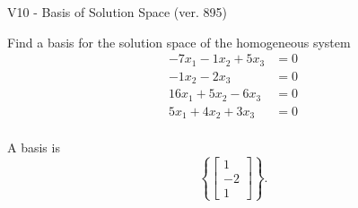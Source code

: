 \begin{exercise}
  \begin{exerciseTitle}V10 - Basis of Solution Space (ver. 895)\end{exerciseTitle}
  \begin{exerciseStatement}
    Find a basis for the solution space of the homogeneous system 
\begin{align*}
 -7 x_ 1 -1 x_ 2 + 5 x_ 3 &= 0  \\ 
  -1 x_ 2 -2 x_ 3 &= 0  \\ 
  16 x_ 1 + 5 x_ 2 -6 x_ 3 &= 0  \\ 
  5 x_ 1 + 4 x_ 2 + 3 x_ 3 &= 0  \\ 
 \end{align*}


 
  \end{exerciseStatement}

  \begin{exerciseAnswer}
   A basis is   
\[\left\{\left[\begin{array}{c}
1 \\
-2 \\
1
\end{array}\right]\right\}.\]

  


  \end{exerciseAnswer}
\end{exercise}